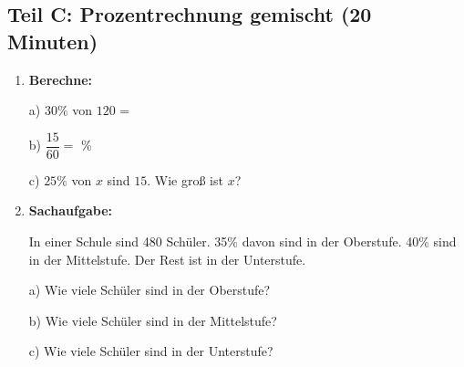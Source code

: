 \subsection*{Teil C: Prozentrechnung gemischt (20 Minuten)}

\begin{enumerate}[label=\arabic*.]
    \item \textbf{Berechne:}
    \vspace{0.5cm}

    a) $30\%$ von $120$ = \underline{\hspace{3cm}}

    b) $\dfrac{15}{60} = $ \underline{\hspace{3cm}} \%

    c) $25\%$ von $x$ sind $15$. Wie groß ist $x$? \underline{\hspace{3cm}}

    \vspace{1cm}

    \item \textbf{Sachaufgabe:}

    In einer Schule sind 480 Schüler. 35\% davon sind in der Oberstufe. 40\% sind in der Mittelstufe. Der Rest ist in der Unterstufe.

    a) Wie viele Schüler sind in der Oberstufe? \underline{\hspace{3cm}}

    b) Wie viele Schüler sind in der Mittelstufe? \underline{\hspace{3cm}}

    c) Wie viele Schüler sind in der Unterstufe? \underline{\hspace{3cm}}

\end{enumerate}